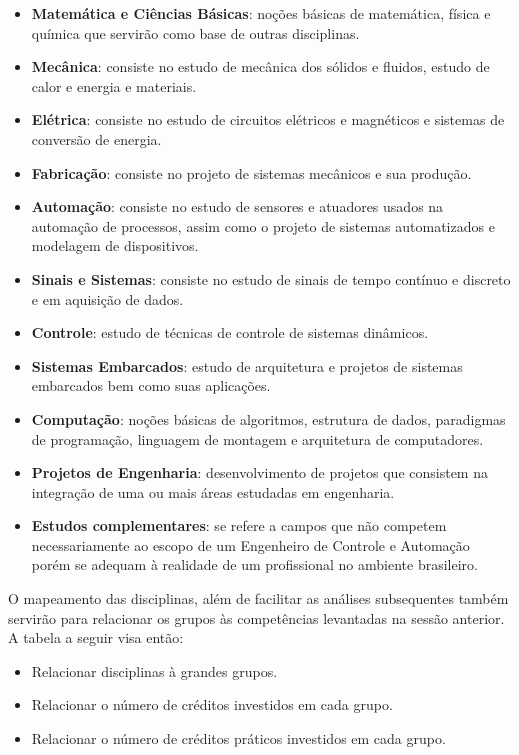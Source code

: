 \documentclass[12pt]{article} %
\begin{document}
\begin{itemize}
\setlength\itemsep{0.01mm}
\item\textbf{Matemática e Ciências Básicas}: noções básicas de matemática, física e química que servirão como base de outras disciplinas.
\item \textbf{Mecânica}: consiste no estudo de mecânica dos sólidos e fluidos, estudo de calor e energia e materiais.
\item \textbf{Elétrica}: consiste no estudo de circuitos elétricos e magnéticos e sistemas de conversão de energia.
\item \textbf{Fabricação}: consiste no projeto de sistemas mecânicos e sua produção.
\item\textbf{Automação}: consiste no estudo de sensores e atuadores usados na automação de processos, assim como o projeto de sistemas automatizados e modelagem de dispositivos.
\item \textbf{Sinais e Sistemas}: consiste no estudo de sinais de tempo contínuo e discreto e em aquisição de dados.
\item\textbf{Controle}: estudo de técnicas de controle de sistemas dinâmicos.
\item \textbf{Sistemas Embarcados}: estudo de arquitetura e projetos de sistemas embarcados bem como suas aplicações.
\item\textbf{Computação}: noções básicas de algoritmos, estrutura de dados, paradigmas de programação, linguagem de montagem e arquitetura de computadores.
\item \textbf{Projetos de Engenharia}: desenvolvimento de projetos que consistem na integração de uma ou mais áreas estudadas em engenharia.
\item \textbf{Estudos complementares}: se refere a campos que não competem necessariamente ao escopo de um Engenheiro de Controle e Automação porém se adequam à realidade de um profissional no ambiente brasileiro.
\end{itemize}

O mapeamento das disciplinas, além de facilitar as análises subsequentes também servirão para relacionar os grupos às competências levantadas na sessão anterior.
A tabela a seguir visa então:
\begin{itemize}
\setlength\itemsep{0.01mm}
\item Relacionar disciplinas à grandes grupos.
\item Relacionar o número de créditos investidos em cada grupo.
\item Relacionar o número de créditos práticos investidos em cada grupo.

\end{itemize}
\end{document}
